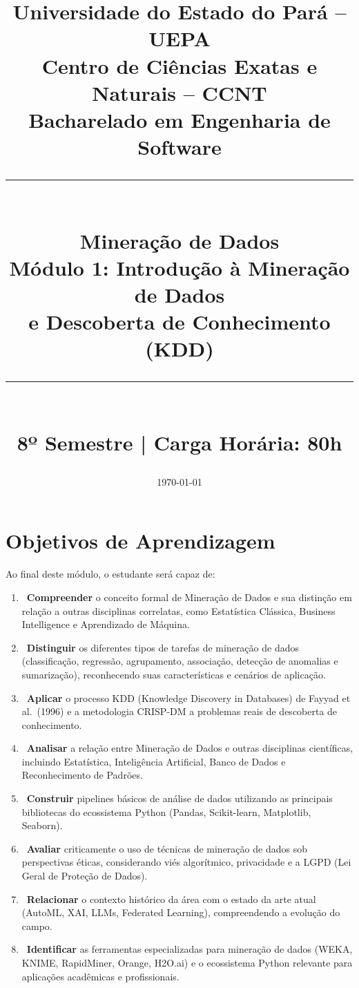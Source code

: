 \documentclass[12pt,a4paper]{article}
\title{
\begin{tcolorbox}[colback=mineblue,coltext=white,colframe=mineblue,width=\textwidth,sharp corners]
\centering
\Large\bfseries Universidade do Estado do Pará -- UEPA\\[4pt]
\normalsize Centro de Ciências Exatas e Naturais -- CCNT\\
Bacharelado em Engenharia de Software\\[8pt]
\rule{\linewidth}{0.5pt}\\[6pt]
\LARGE \faIcon{database} Mineração de Dados\\[4pt]
\Large Módulo 1: Introdução à Mineração de Dados\\e Descoberta de Conhecimento (KDD)\\[6pt]
\rule{\linewidth}{0.5pt}\\[4pt]
\normalsize 8º Semestre | Carga Horária: 80h
\end{tcolorbox}
}
\author{}
\date{\today}
\begin{document}
\maketitle
\thispagestyle{empty}
\newpage

\tableofcontents
\newpage

\section{Objetivos de Aprendizagem}

Ao final deste módulo, o estudante será capaz de:

\begin{enumerate}[leftmargin=*, label=\textbf{\arabic*.}]
  \item {}~\textbf{Compreender} o conceito formal de Mineração de Dados e sua distinção em relação a outras disciplinas correlatas, como Estatística Clássica, Business Intelligence e Aprendizado de Máquina.

  \item {}~\textbf{Distinguir} os diferentes tipos de tarefas de mineração de dados (classificação, regressão, agrupamento, associação, detecção de anomalias e sumarização), reconhecendo suas características e cenários de aplicação.

  \item {}~\textbf{Aplicar} o processo KDD (Knowledge Discovery in Databases) de Fayyad et al.\ (1996) e a metodologia CRISP-DM a problemas reais de descoberta de conhecimento.

  \item {}~\textbf{Analisar} a relação entre Mineração de Dados e outras disciplinas científicas, incluindo Estatística, Inteligência Artificial, Banco de Dados e Reconhecimento de Padrões.

  \item {}~\textbf{Construir} pipelines básicos de análise de dados utilizando as principais bibliotecas do ecossistema Python (Pandas, Scikit-learn, Matplotlib, Seaborn).

  \item {}~\textbf{Avaliar} criticamente o uso de técnicas de mineração de dados sob perspectivas éticas, considerando viés algorítmico, privacidade e a LGPD (Lei Geral de Proteção de Dados).

  \item {}~\textbf{Relacionar} o contexto histórico da área com o estado da arte atual (AutoML, XAI, LLMs, Federated Learning), compreendendo a evolução do campo.

  \item {}~\textbf{Identificar} as ferramentas especializadas para mineração de dados (WEKA, KNIME, RapidMiner, Orange, H2O.ai) e o ecossistema Python relevante para aplicações acadêmicas e profissionais.
\end{enumerate}
\end{document}
